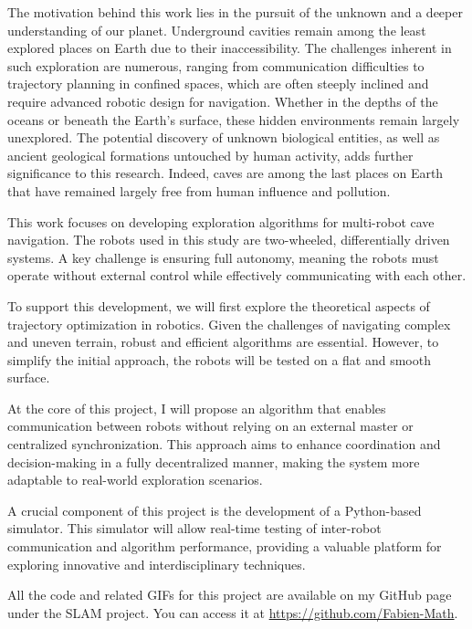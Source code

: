 \documentclass[../main.tex]{subfiles}
\begin{document}
The motivation behind this work lies in the pursuit of the unknown and a deeper understanding of our planet. Underground cavities remain among the least explored places on Earth due to their inaccessibility. The challenges inherent in such exploration are numerous, ranging from communication difficulties to trajectory planning in confined spaces, which are often steeply inclined and require advanced robotic design for navigation. Whether in the depths of the oceans or beneath the Earth's surface, these hidden environments remain largely unexplored. The potential discovery of unknown biological entities, as well as ancient geological formations untouched by human activity, adds further significance to this research. Indeed, caves are among the last places on Earth that have remained largely free from human influence and pollution.

\vspace{1em}

This work focuses on developing exploration algorithms for multi-robot cave navigation. The robots used in this study are two-wheeled, differentially driven systems. A key challenge is ensuring full autonomy, meaning the robots must operate without external control while effectively communicating with each other.

\vspace{0.5em}

To support this development, we will first explore the theoretical aspects of trajectory optimization in robotics. Given the challenges of navigating complex and uneven terrain, robust and efficient algorithms are essential. However, to simplify the initial approach, the robots will be tested on a flat and smooth surface.

\vspace{0.5em}

At the core of this project, I will propose an algorithm that enables communication between robots without relying on an external master or centralized synchronization. This approach aims to enhance coordination and decision-making in a fully decentralized manner, making the system more adaptable to real-world exploration scenarios.

\vspace{0.5em}

A crucial component of this project is the development of a Python-based simulator. This simulator will allow real-time testing of inter-robot communication and algorithm performance, providing a valuable platform for exploring innovative and interdisciplinary techniques.

\vspace{5em}

{\small All the code and related GIFs for this project are available on my GitHub page under the SLAM project. You can access it at \href{https://github.com/Fabien-Math}{https://github.com/Fabien-Math}.}
\end{document}
